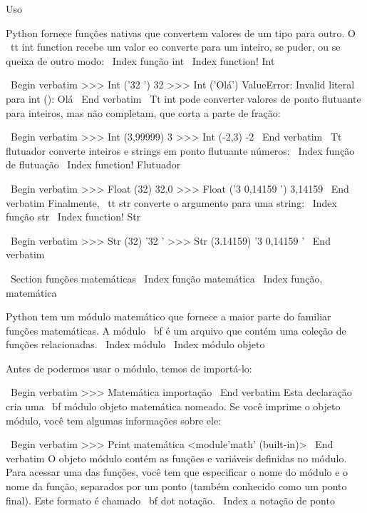 \documentclass[10pt]{book}
\begin{document}
{%
Uso%


Python fornece funções nativas que convertem valores
de um tipo para outro. O {\ tt int} function recebe um valor eo
converte para um inteiro, se puder, ou se queixa de outro modo:
\ Index {função int}
\ Index {function! Int}

\ Begin {verbatim}
>>> Int ('32 ')
32
>>> Int ('Olá')
ValueError: Invalid literal para int (): Olá
\ End {verbatim}
%
{\ Tt int} pode converter valores de ponto flutuante para inteiros, mas
não completam, que corta a parte de fração:

\ Begin {verbatim}
>>> Int (3,99999)
3
>>> Int (-2,3)
-2
\ End {verbatim}
%
{\ Tt flutuador} converte inteiros e strings em ponto flutuante
números:
\ Index {função de flutuação}
\ Index {function! Flutuador}

\ Begin {verbatim}
>>> Float (32)
32,0
>>> Float ('3 0,14159 ')
3,14159
\ End {verbatim}
%
Finalmente, {\ tt str} converte o argumento para uma string:
\ Index {função str}
\ Index {function! Str}

\ Begin {verbatim}
>>> Str (32)
'32 '
>>> Str (3.14159)
'3 0,14159 '
\ End {verbatim}
%



\ Section {funções matemáticas}
\ Index {função matemática}
\ Index {função, matemática}

Python tem um módulo matemático que fornece a maior parte do familiar
funções matemáticas. A {módulo \ bf} é um arquivo que contém uma
coleção de funções relacionadas.
\ Index {módulo}
\ Index {módulo objeto}

Antes de podermos usar o módulo, temos de importá-lo:

\ Begin {verbatim}
>>> Matemática importação
\ End {verbatim}
%
Esta declaração cria uma {\ bf módulo objeto} matemática nomeado. Se
você imprime o objeto módulo, você tem algumas informações sobre ele:

\ Begin {verbatim}
>>> Print matemática
<module'math' (built-in)>
\ End {verbatim}
%
O objeto módulo contém as funções e variáveis ​​definidas no
módulo. Para acessar uma das funções, você tem que especificar o nome
do módulo e o nome da função, separados por um ponto (também
conhecido como um ponto final). Este formato é chamado {\ bf dot notação}.
\ Index {} a notação de ponto

}
\end{document}
